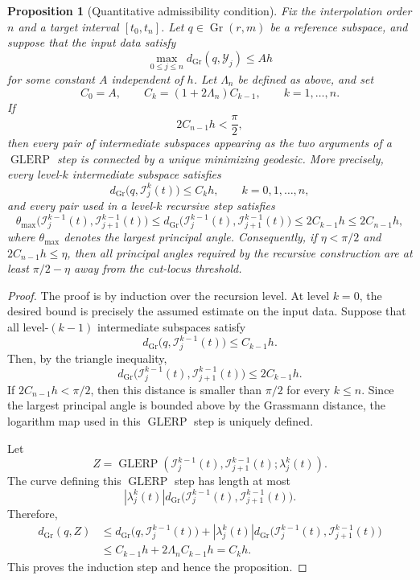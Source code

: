 \documentclass[a4paper,11pt]{article}
\DeclareMathOperator{\Gr}{Gr}
\newcommand{\GLERP}{\operatorname{GLERP}}
\numberwithin{equation}{section}
\theoremstyle{plain}
\newtheorem{prop}[thm]{Proposition}
\theoremstyle{definition}
\theoremstyle{remark}
\begin{document}
\begin{prop}[Quantitative admissibility condition]
\label{prop:quantitative_admissibility}
Fix the interpolation order \(n\) and a target interval \([t_0,t_n]\).  Let \(q\in\Gr(r,m)\) be a reference subspace, and suppose that the input data satisfy
\[
    \max_{0\le j\le n} d_{\Gr}(q,\mathcal{Y}_j) \le A h
\]
for some constant \(A\) independent of \(h\).  Let \(\Lambda_n\) be defined as above, and set
\[
    C_0=A,
    \qquad
    C_k=(1+2\Lambda_n)C_{k-1},
    \qquad k=1,\ldots,n.
\]
If
\[
    2C_{n-1}h < \frac{\pi}{2},
\]
then every pair of intermediate subspaces appearing as the two arguments of a \(\GLERP\) step is connected by a unique minimizing geodesic.  More precisely, every level-\(k\) intermediate subspace satisfies
\[
    d_{\Gr}\bigl(q,\mathcal{I}_j^k(t)\bigr)
    \le C_k h,
    \qquad
    k=0,1,\ldots,n,
\]
and every pair used in a level-\(k\) recursive step satisfies
\[
    \theta_{\max}\bigl(\mathcal{I}_j^{k-1}(t),
    \mathcal{I}_{j+1}^{k-1}(t)\bigr)
    \le
    d_{\Gr}\bigl(\mathcal{I}_j^{k-1}(t),
    \mathcal{I}_{j+1}^{k-1}(t)\bigr)
    \le 2C_{k-1}h
    \le 2C_{n-1}h,
\]
where \(\theta_{\max}\) denotes the largest principal angle.  Consequently, if \(\eta<\pi/2\) and \(2C_{n-1}h\le \eta\), then all principal angles required by the recursive construction are at least \(\pi/2-\eta\) away from the cut-locus threshold.
\end{prop}

\begin{proof}
The proof is by induction over the recursion level.  At level \(k=0\), the desired bound is precisely the assumed estimate on the input data.  Suppose that all level-\((k-1)\) intermediate subspaces satisfy
\[
    d_{\Gr}\bigl(q,\mathcal{I}_j^{k-1}(t)\bigr)
    \le C_{k-1}h.
\]
Then, by the triangle inequality,
\[
    d_{\Gr}\bigl(\mathcal{I}_j^{k-1}(t),
    \mathcal{I}_{j+1}^{k-1}(t)\bigr)
    \le 2C_{k-1}h.
\]
If \(2C_{n-1}h<\pi/2\), then this distance is smaller than \(\pi/2\) for every \(k\le n\).  Since the largest principal angle is bounded above by the Grassmann distance, the logarithm map used in this \(\GLERP\) step is uniquely defined.

Let
\[
    Z=\GLERP\left(
        \mathcal{I}_j^{k-1}(t),
        \mathcal{I}_{j+1}^{k-1}(t);
        \lambda_j^k(t)
    \right).
\]
The curve defining this \(\GLERP\) step has length at most
\[
    \left|\lambda_j^k(t)\right|
    d_{\Gr}\bigl(\mathcal{I}_j^{k-1}(t),
    \mathcal{I}_{j+1}^{k-1}(t)\bigr).
\]
Therefore,
\[
\begin{split}
    d_{\Gr}(q,Z)
    &\le
    d_{\Gr}\bigl(q,\mathcal{I}_j^{k-1}(t)\bigr)
    +
    \left|\lambda_j^k(t)\right|
    d_{\Gr}\bigl(\mathcal{I}_j^{k-1}(t),
    \mathcal{I}_{j+1}^{k-1}(t)\bigr)  \\
    &\le C_{k-1}h+2\Lambda_n C_{k-1}h
    = C_k h.
\end{split}
\]
This proves the induction step and hence the proposition.
\end{proof}
\end{document}
